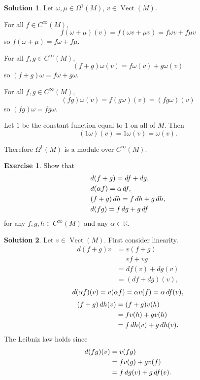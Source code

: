 \documentclass[11pt, a4paper]{report}
\theoremstyle{definition}
\newtheorem{exercise}{Exercise}[part]
\newtheorem{solution}{Solution}[part]
\newenvironment{ex}{\begin{exercise}}{\end{exercise}\pagebreak[1]}
\newenvironment{sol}{\begin{solution}}{\end{solution}\pagebreak[3]}
\renewcommand*{\d}{\ensuremath\mathop{}\mathopen{}d}
\DeclareMathOperator{\Vect}{Vect}
\begin{document}
\begin{sol}

Let $\omega, \mu \in \Omega^1(M)$, $v\in \Vect(M)$.

For all $f \in C^\infty(M)$,
\[
    f(\omega + \mu)(v) = f(\omega v + \mu v) = f\omega v + f\mu v
\]
so $f(\omega + \mu) = f\omega + f\mu$.

For all $f, g \in C^\infty(M)$,
\[
    (f + g)\omega(v) = f\omega(v) + g\omega(v)
\]
so $(f + g)\omega = f\omega + g\omega$.

For all $f, g \in C^\infty(M)$,
\[
    (fg)\omega(v) = f(g\omega)(v) = (fg\omega)(v)
\]
so $(fg)\omega = fg\omega$.

Let $1$ be the constant function equal to $1$ on all of $M$. Then
\[
    (1\omega)(v) = 1\omega(v) = \omega(v).
\]

Therefore $\Omega^1(M)$ is a module over $C^\infty(M)$.

\end{sol}

\begin{ex}

Show that
\begin{align*}
    & d(f + g) = df + dg, \\
    & d(\alpha f) = \alpha \d f, \\
    & (f + g) \d h = f \d h + g \d h, \\
    & d(fg) = f \d g + g \d f
\end{align*}
for any $f, g, h \in C^\infty(M)$ and any $\alpha \in \mathbb{R}$.

\end{ex}

\begin{sol}

Let $v \in \Vect(M)$. First consider linearity.
\begin{align*}
    d(f + g)v &= v(f + g) \\
              &= vf + vg \\
              &= df(v) + dg(v) \\
              &= (df + dg)(v),
\end{align*}
\[
    d(\alpha f)(v) = v(\alpha f) = \alpha v(f) = \alpha \d f(v),
\]
\begin{align*}
    (f + g) \d h(v) &= (f + g)v(h) \\
                     &= fv(h) + gv(h) \\
                     &= f\d h(v) + g \d h(v).
\end{align*}
The Leibniz law holds since
\begin{align*}
    d(fg)(v) &= v(fg) \\
             &= f v(g) + g v(f) \\
             &= f \d g(v) + g \d f(v).
\end{align*}

\end{sol}
\end{document}

